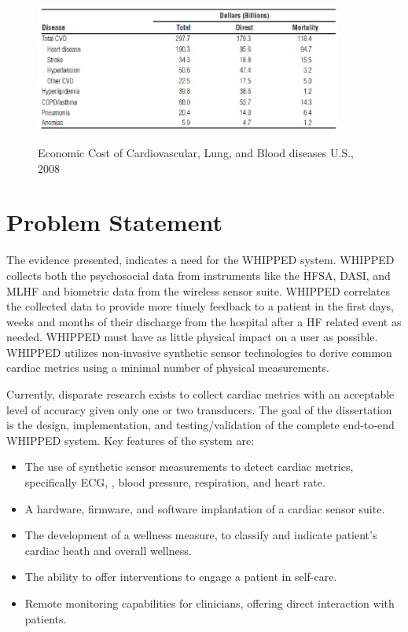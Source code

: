 \begin{figure}
	\begin{center}
		\label{fig:CVDCost}
		\includegraphics[scale=1,width=0.9\textwidth]{Images/CostOfCVD.jpg} 
		\caption{Economic Cost of Cardiovascular, Lung, and Blood diseases U.S., 2008 }
	\end{center}
\end{figure}

\section{Problem Statement}
\label{sec:problemStatement}
The evidence presented, indicates a need for the WHIPPED system. WHIPPED collects both the psychosocial data from instruments like the HFSA, DASI, and MLHF and biometric data from the wireless sensor suite.  WHIPPED correlates the collected data to provide more timely feedback to a patient in the first days, weeks and months of their discharge from the hospital after a HF related event as needed. WHIPPED must have as little physical impact on a user as possible. WHIPPED utilizes non-invasive synthetic sensor technologies to derive common cardiac metrics using a minimal number of physical measurements. 

Currently, disparate research exists to collect cardiac metrics with an acceptable level of accuracy given only one or two transducers. The goal of the dissertation is the design, implementation, and testing/validation of the complete end-to-end WHIPPED system. Key features of the system are:

\begin{itemize}
\item The use of synthetic sensor measurements to detect cardiac metrics, specifically ECG, , blood pressure, respiration, and heart rate.
\item A hardware, firmware, and software implantation of a cardiac sensor suite.
\item The development of a wellness measure, to classify and indicate patient's cardiac heath and overall wellness. \cite{Chaiyasucheeva2012}
\item The ability to offer interventions to engage a patient in self-care.
\item Remote monitoring capabilities for clinicians, offering direct interaction with patients.
\end{itemize}

